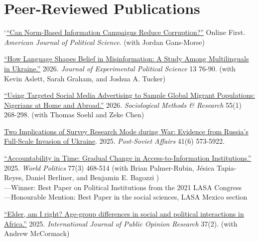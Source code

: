 \documentclass[margin,line]{res}
\begin{document}
\singlespacing

\section{\sc Peer-Reviewed Publications}

\renewcommand{\labelenumi}{\theenumi.}
\begin{etaremune}

  \item `\href{http://doi.org/10.1111/ajps.12940}{``Can Norm-Based Information Campaigns Reduce Corruption?''} Online First. \textit{American Journal of Political Science}.  (with Jordan Gans-Morse)

 \item \href{https://doi.org/10.1017/XPS.2025.10011} {``How Language Shapes Belief in Misinformation:  A Study Among Multilinguals in Ukraine.''}
     2026. \textit{Journal of Experimental Political Science} 13 76-90.  (with Kevin Aslett,  Sarah Graham, and Joshua A. Tucker)

 \item \href{https://doi.org/10.1177/00491241241266634}{``Using Targeted Social Media Advertising to Sample Global Migrant Populations: Nigerians at Home and Abroad.''} 2026. \textit{Sociological Methods \& Research} 55(1) 268-298. (with Thomas Soehl and Zeke Chen)

  \item{ \href{https://doi.org/10.1080/1060586X.2025.2529114}{Two Implications of Survey Research Mode during War: Evidence from Russia's Full-Scale Invasion of Ukraine}. 2025. \textit{Post-Soviet Affairs} 41(6) 573-5922.

   \item \href{https://dx.doi.org/10.1353/wp.2025.a964463}{``Accountability in Time: Gradual Change in Access-to-Information Institutions.''} 2025. \textit{World Politics} 77(3) 468-514 (with Brian Palmer-Rubin, Jésica Tapia-Reyes, Daniel Berliner, and Benjamin E. Bagozzi )  \\
      ---Winner: Best Paper on Political Institutions from the 2021 LASA Congress\\
      ---Honourable Mention: Best Paper in the social sciences, LASA Mexico section

\item \href{https://doi.org/10.1093/ijpor/edaf003}{``Elder, am I right? Age-group differences in social and political interactions in Africa.''} 2025.  \textit{International Journal of Public Opinion Research} 37(2). (with Andrew McCormack)

}
\end{etaremune}
\end{document}

